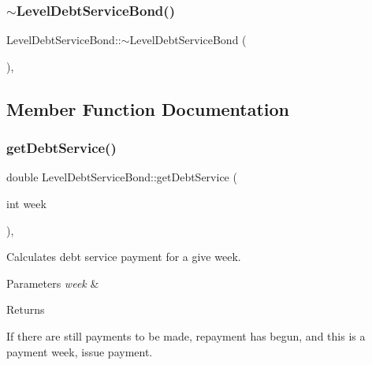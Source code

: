 \mbox{\label{classLevelDebtServiceBond_a6327829c1f1e6941cc22cea371cf024a_a6327829c1f1e6941cc22cea371cf024a}} 
\subsubsection{\texorpdfstring{$\sim$\+Level\+Debt\+Service\+Bond()}{~LevelDebtServiceBond()}}
{\footnotesize\ttfamily Level\+Debt\+Service\+Bond\+::$\sim$\+Level\+Debt\+Service\+Bond (\begin{DoxyParamCaption}{ }\end{DoxyParamCaption})\hspace{0.3cm}{\ttfamily [override]}, {\ttfamily [default]}}



\subsection{Member Function Documentation}
\mbox{\label{classLevelDebtServiceBond_adcb3bd3c34b0cbb7b013f387ddd8b7f5_adcb3bd3c34b0cbb7b013f387ddd8b7f5}} 
\subsubsection{\texorpdfstring{get\+Debt\+Service()}{getDebtService()}}
{\footnotesize\ttfamily double Level\+Debt\+Service\+Bond\+::get\+Debt\+Service (\begin{DoxyParamCaption}\item[{int}]{week }\end{DoxyParamCaption})\hspace{0.3cm}{\ttfamily [override]}, {\ttfamily [virtual]}}

Calculates debt service payment for a give week. 
\begin{DoxyParams}{Parameters}
{\em week} & \\
\hline
\end{DoxyParams}
\begin{DoxyReturn}{Returns}

\end{DoxyReturn}
If there are still payments to be made, repayment has begun, and this is a payment week, issue payment. 

